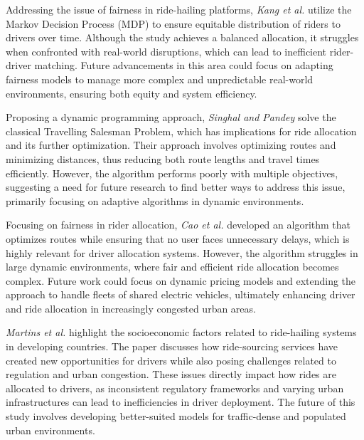 Addressing the issue of fairness in ride-hailing platforms, \textit{Kang et al.} \cite{kang-2024} utilize the Markov Decision Process (MDP) to ensure equitable distribution of riders to drivers over time. Although the study achieves a balanced allocation, it struggles when confronted with real-world disruptions, which can lead to inefficient rider-driver matching. Future advancements in this area could focus on adapting fairness models to manage more complex and unpredictable real-world environments, ensuring both equity and system efficiency.

Proposing a dynamic programming approach, \textit{Singhal and Pandey} \cite{singhal-2016} solve the classical Travelling Salesman Problem, which has implications for ride allocation and its further optimization. Their approach involves optimizing routes and minimizing distances, thus reducing both route lengths and travel times efficiently. However, the algorithm performs poorly with multiple objectives, suggesting a need for future research to find better ways to address this issue, primarily focusing on adaptive algorithms in dynamic environments.

Focusing on fairness in rider allocation, \textit{Cao et al.} \cite{cao-2021} developed an algorithm that optimizes routes while ensuring that no user faces unnecessary delays, which is highly relevant for driver allocation systems. However, the algorithm struggles in large dynamic environments, where fair and efficient ride allocation becomes complex. Future work could focus on dynamic pricing models and extending the approach to handle fleets of shared electric vehicles, ultimately enhancing driver and ride allocation in increasingly congested urban areas.

\textit{Martins et al.} \cite{martins-2024} highlight the socioeconomic factors related to ride-hailing systems in developing countries. The paper discusses how ride-sourcing services have created new opportunities for drivers while also posing challenges related to regulation and urban congestion. These issues directly impact how rides are allocated to drivers, as inconsistent regulatory frameworks and varying urban infrastructures can lead to inefficiencies in driver deployment. The future of this study involves developing better-suited models for traffic-dense and populated urban environments.


